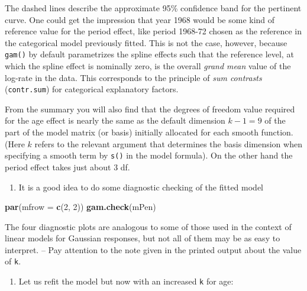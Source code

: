 \documentclass[
]{book}
\newenvironment{Shaded}{\begin{snugshade}}{\end{snugshade}}
\newcommand{\AttributeTok}[1]{\textcolor[rgb]{0.13,0.29,0.53}{#1}}
\newcommand{\DecValTok}[1]{\textcolor[rgb]{0.00,0.00,0.81}{#1}}
\newcommand{\FunctionTok}[1]{\textcolor[rgb]{0.13,0.29,0.53}{\textbf{#1}}}
\newcommand{\NormalTok}[1]{#1}
\providecommand{\tightlist}{%
  \setlength{\itemsep}{0pt}\setlength{\parskip}{0pt}}
\begin{document}
The dashed lines describe the approximate 95\% confidence band for the pertinent
curve. One could get the impression that year 1968 would be some kind
of reference value for the period effect, like period 1968-72
chosen as the reference in the categorical
model previously fitted. This is not the case, however, because
\texttt{gam()} by default parametrizes the spline effects such that the
reference level, at which the spline effect is nominally zero, is the
overall \emph{grand mean} value of the log-rate in the data. This
corresponds to the principle of \emph{sum contrasts} (\texttt{contr.sum})
for categorical explanatory factors.

From the summary you will also find that the degrees of freedom value
required for the age effect is nearly the same as the default
dimension \(k-1 = 9\) of the part of the model matrix (or basis)
initially allocated for each smooth function. (Here \(k\) refers to the
relevant argument that determines the basis dimension when specifying
a smooth term by \texttt{s()} in the model formula). On the other
hand the period effect takes just about 3 df.

\begin{enumerate}
\def\labelenumi{\arabic{enumi}.}
\setcounter{enumi}{2}
\tightlist
\item
  It is a good idea to do some diagnostic checking of the fitted
  model
\end{enumerate}

\begin{Shaded}
\begin{Highlighting}[]
\FunctionTok{par}\NormalTok{(}\AttributeTok{mfrow =} \FunctionTok{c}\NormalTok{(}\DecValTok{2}\NormalTok{, }\DecValTok{2}\NormalTok{))}
\FunctionTok{gam.check}\NormalTok{(mPen)}
\end{Highlighting}
\end{Shaded}

The four diagnostic plots are analogous to some of those used in
the context of linear models for Gaussian responses, but not all of them
may be as easy to interpret. -- Pay attention to the note
given in the printed output about the value of \texttt{k}.

\begin{enumerate}
\def\labelenumi{\arabic{enumi}.}
\setcounter{enumi}{3}
\tightlist
\item
  Let us refit the model but now with an increased \texttt{k} for age:
\end{enumerate}
\end{document}
